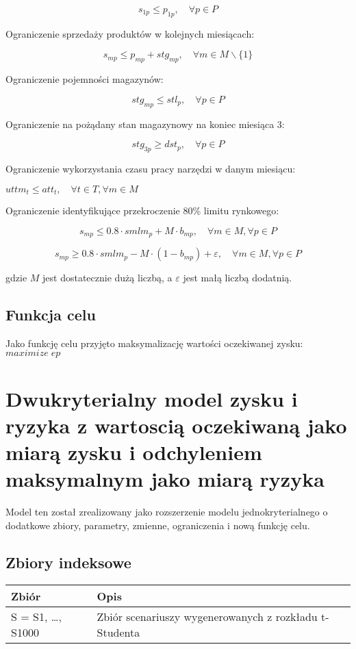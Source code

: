 \documentclass{article}
\begin{document}
$$s_{1p} \leqslant p_{1p}, \quad \forall p \in P$$

Ograniczenie sprzedaży produktów w kolejnych miesiącach:

$$s_{mp} \leqslant p_{mp} + stg_{mp}, \quad \forall m \in M \backslash \{1\}$$

Ograniczenie pojemności magazynów:

$$stg_{mp} \leqslant stl_p, \quad \forall p \in P$$

Ograniczenie na pożądany stan magazynowy na koniec miesiąca 3:

$$stg_{3p} \geqslant dst_p, \quad \forall p \in P$$

Ograniczenie wykorzystania czasu pracy narzędzi w danym miesiącu:

$uttm_t \leq att_t, \quad \forall t \in T, \forall m \in M$

Ograniczenie identyfikujące przekroczenie 80\% limitu rynkowego:

$$s_{mp} \leq 0.8 \cdot smlm_p + M \cdot b_{mp}, \quad \forall m \in M, \forall p \in P$$

$$s_{mp} \geq 0.8 \cdot smlm_p - M \cdot (1 - b_{mp}) + \varepsilon, \quad \forall m \in M, \forall p \in P$$

gdzie $M$ jest dostatecznie dużą liczbą, a $\varepsilon$ jest małą liczbą dodatnią.

\subsection{Funkcja celu}

Jako funkcję celu przyjęto maksymalizację wartości oczekiwanej zysku: $maximize \; ep$

\section{Dwukryterialny model zysku i ryzyka z wartoscią oczekiwaną jako miarą zysku i odchyleniem maksymalnym jako miarą ryzyka}

Model ten został zrealizowany jako rozszerzenie modelu jednokryterialnego o dodatkowe zbiory, parametry, zmienne, ograniczenia i nową funkcję celu.

\subsection{Zbiory indeksowe}

\begin{table}[H]
\centering
\begin{tabular}{|l|l|}
\hline
Zbiór & Opis \\
\hline
S = S1, \ldots, S1000 & Zbiór scenariuszy wygenerowanych z rozkładu t-Studenta \\
\hline
\end{tabular}
\end{table}
\end{document}
